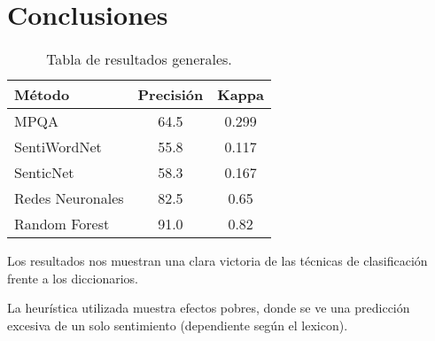 \section{Conclusiones}

\begin{table}[H]
    \centering
    \begin{tabular}{|l|c|c|}
    \hline
    \textbf{Método}  & \textbf{Precisión} & \textbf{Kappa} \\ \hline
    MPQA             & 64.5               & 0.299          \\ \hline
    SentiWordNet     & 55.8               & 0.117          \\ \hline
    SenticNet        & 58.3               & 0.167          \\ \hline
    \hline
    Redes Neuronales & 82.5               & 0.65           \\ \hline
    Random Forest    & 91.0               & 0.82           \\ \hline
    \end{tabular}
    \caption{Tabla de resultados generales.}
\end{table}

Los resultados nos muestran una clara victoria de las técnicas de clasificación frente a los diccionarios.

La heurística utilizada muestra efectos pobres, donde se ve una predicción excesiva de un solo sentimiento (dependiente según el lexicon).